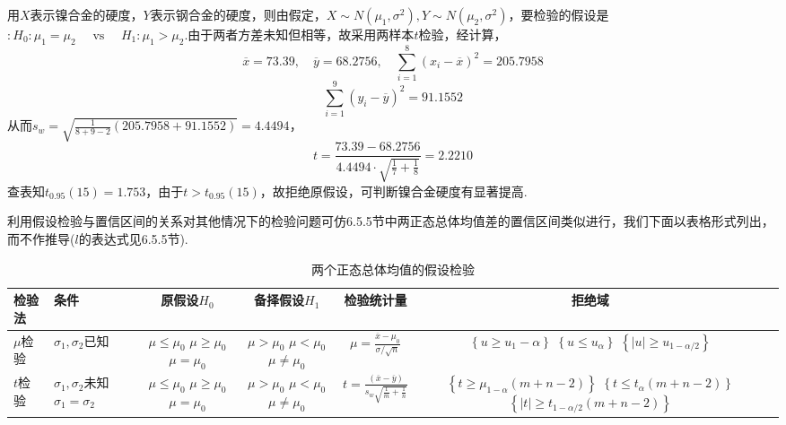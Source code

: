 \begin{solution}
	用$X$表示镍合金的硬度，$Y$表示钢合金的硬度，则由假定，$X\sim N(\mu_{ 1 },\sigma^{2}),Y\sim N(\mu_{ 2},\sigma^{ 2 })$，要检验的假设是$:H _ { 0 } : \mu _ { 1 } = \mu _ { 2 } \quad \text { vs } \quad H _ { 1 } : \mu _ { 1 } > \mu _ { 2 }$.由于两者方差未知但相等，故采用两样本$t$检验，经计算，
	\[\overline { x } = 73.39 , \quad \overline { y } = 68.2756 , \quad \sum _ { i = 1 } ^ { 8 } \left( x _ { i } - \overline { x } \right) ^ { 2 } = 205.7958\]
	\[\sum _ { i = 1 } ^ { 9 } \left( y _ { i } - \overline { y } \right) ^ { 2 } = 91.1552\]
	从而$s _ { w } = \sqrt { \frac { 1 } { 8 + 9 - 2 } ( 205.7958 + 91.1552 ) } = 4.4494$，
	\[t = \frac { 73.39 - 68.2756 } { 4.4494 \cdot \sqrt { \frac { 1 } { 7 } + \frac { 1 } { 8 } } } = 2.2210\]
	查表知$t _ { 0.95 } ( 15 ) = 1.753$，由于$t>t_{0.95}(15)$，故拒绝原假设，可判断镍合金硬度有显著提高.
	
	利用假设检验与置信区间的关系对其他情况下的检验问题可仿6.5.5节中两正态总体均值差的置信区间类似进行，我们下面以表格形式列出，而不作推导($l$的表达式见6.5.5节).
		\begin{table}[!ht]
		\centering
		\caption{两个正态总体均值的假设检验}\label{tab7.2.2}
		\begin{tabularx}{\textwidth}{p{1.5cm}p{2.5cm}ccccc}
			\toprule
			检验法&条件&原假设$H_{0}$&备择假设$H_{1}$&检验统计量&拒绝域\\
			\midrule
			$\mu $检验&$\sigma_{1},\sigma_{ 2 }$已知&\parbox{1.5cm}{$\mu \leq \mu _ { 0 }$\\$\mu \geq \mu _ { 0 }$\\$\mu = \mu _ { 0 }$}&\parbox{1.2cm}{$\mu > \mu _ { 0 }$\\$\mu < \mu _ { 0 }$\\$\mu \ne  \mu _ { 0 }$}&$\mu = \frac { \overline { x } - \mu _ { 0 } } { \sigma / \sqrt { n } }$&\parbox{1.2cm}{$\left\lbrace  u \geq u _ { 1 } - \alpha \right\rbrace $\\$\left\lbrace  u \leq u _ {\alpha} \right\rbrace $\\$\left\lbrace  |u| \geq u _ { 1- \alpha/ 2} \right\rbrace $}\\
			$t $检验&\parbox{1.5cm}{$\sigma_{1},\sigma_{ 2 }\text{未知}$\\$\sigma_{ 1 }=\sigma_{ 2 }$}&\parbox{1.5cm}{$\mu \leq \mu _ { 0 }$\\$\mu \geq \mu _ { 0 }$\\$\mu = \mu _ { 0 }$}&\parbox{1.2cm}{$\mu > \mu _ { 0 }$\\$\mu < \mu _ { 0 }$\\$\mu \ne  \mu _ { 0 }$}
			&$t = \frac { ( \overline { x } - \overline { y } ) } { s _ { w } \sqrt { \frac { 1 } { m } + \frac { 1 } { n } } }$
			&\parbox{1.2cm}{$\left\{t\geq\mu_{1-\alpha}\left(m+n-2\right)\right\} $\\$\left\{ t\leq t_{\alpha}\left(m+n-2\right)\right\} $\\$\left\{\left| t\right|\geq t_{1-\alpha/2}\left(m+n-2\right)\right\} $}\\
			\bottomrule
		\end{tabularx}
	\end{table}

\end{solution}
